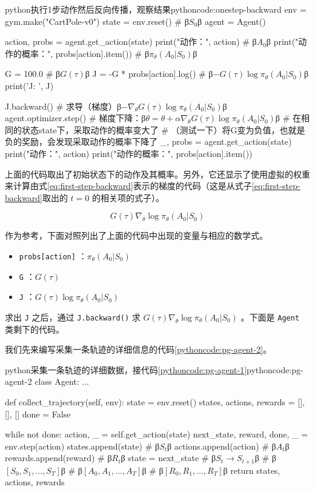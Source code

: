 \documentclass[lang=cn,newtx,10pt,scheme=chinese]{elegantbook}
\newcommand{\py}[1]{%
  \colorbox{gray!10}{\texttt{#1}}%
}
\begin{document}
\begin{codebox}{python}{执行1步动作然后反向传播，观察结果}{pythoncode:onestep-backward}
env = gym.make("CartPole-v0")
state = env.reset() # β$S_0$β
agent = Agent()

action, probs = agent.get_action(state)
print("动作：", action) # β$A_0$β
print("动作的概率：", probs[action].item()) # β$\pi_\theta(A_0|S_0)$β

G = 100.0 # β$G(\tau)$β
J = -G * probs[action].log() # β$-G(\tau)\log{\pi_\theta(A_0|S_0)}$β
print('J: ', J)

J.backward() # 求导（梯度）β$-\nabla_\theta G(\tau)\log{\pi_\theta(A_0|S_0)}$β
agent.optimizer.step() # 梯度下降：β$\theta=\theta+\alpha\nabla_\theta G(\tau)\log{\pi_\theta(A_0|S_0)}$β
# 在相同的状态state下，采取动作的概率变大了
# （测试一下）将G变为负值，也就是负的奖励，会发现采取动作的概率下降了
_, probs = agent.get_action(state)
print("动作：", action)
print("动作的概率：", probs[action].item())
\end{codebox}

上面的代码取出了初始状态下的动作及其概率。另外，它还显示了使用虚拟的权重来计算由式\ref{eq:first-step-backward}表示的梯度的代码（这是从式子\ref{eq:first-step-backward}取出的 $t = 0$ 的相关项的式子）。

\begin{equation}\label{eq:first-step-backward}
G(\tau)\nabla_{\theta}\log\pi_{\theta}(A_0|S_0)
\end{equation}

作为参考，下面对照列出了上面的代码中出现的变量与相应的数学式。

\begin{itemize}
\item \py{probs[action]}：$\pi_{\theta}(A_0|S_0)$
\item \py{G}：$G(\tau)$
\item \py{J}：$G(\tau)\log\pi_{\theta}(A_0|S_0)$
\end{itemize}

求出\py{J}之后，通过\py{J.backward()}求 $G(\tau)\nabla_{\theta}\log\pi_{\theta}(A_0|S_0)$ 。下面是\py{Agent}类剩下的代码。

我们先来编写采集一条轨迹的详细信息的代码\ref{pythoncode:pg-agent-2}。

\begin{codebox}{python}{采集一条轨迹的详细数据，接代码\ref{pythoncode:pg-agent-1}}{pythoncode:pg-agent-2}
class Agent:
    ...

    def collect_trajectory(self, env):
        state = env.reset()
        states, actions, rewards = [], [], []
        done = False

        while not done:
            action, _ = self.get_action(state)
            next_state, reward, done, _ = env.step(action)
            states.append(state) # β$S_t$β
            actions.append(action) # β$A_t$β
            rewards.append(reward) # β$R_t$β
            state = next_state # β$S_t \rightarrow S_{t+1}$β
        # β$[S_0, S_1, \dots, S_T]$β
        # β$[A_0, A_1, \dots, A_T]$β
        # β$[R_0, R_1, \dots, R_T]$β
        return states, actions, rewards
\end{codebox}
\end{document}

